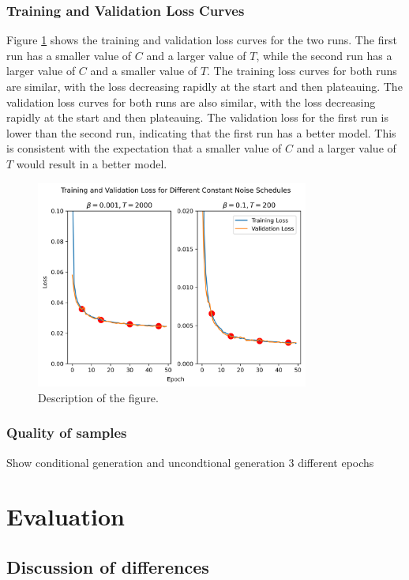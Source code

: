 \documentclass[11pt]{article}
\begin{document}
\subsubsection{Training and Validation Loss Curves}
Figure \ref{fig:q1b_loss_curves} shows the training and validation loss curves for the two runs. The first run has a smaller value of $C$ and a larger value of $T$, while the second run has a larger value of $C$ and a smaller value of $T$. The training loss curves for both runs are similar, with the loss decreasing rapidly at the start and then plateauing. The validation loss curves for both runs are also similar, with the loss decreasing rapidly at the start and then plateauing. The validation loss for the first run is lower than the second run, indicating that the first run has a better model. This is consistent with the expectation that a smaller value of $C$ and a larger value of $T$ would result in a better model.

\begin{figure}[ht]
    \centering
    \includegraphics[width=0.8\textwidth]{figs/q1b_loss.png}
    \caption{Description of the figure.}
    \label{fig:q1b_loss_curves}
\end{figure}

\subsubsection{Quality of samples}
Show conditional generation and uncondtional generation 3 different epochs

\section{Evaluation}

\subsection{Discussion of differences}
\end{document}
